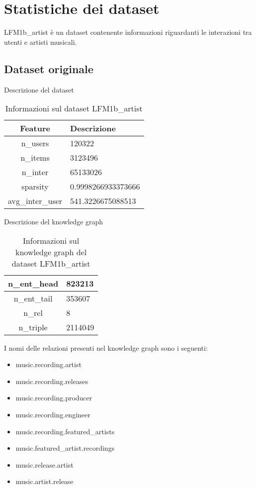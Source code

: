 \section{Statistiche dei dataset}

LFM1b\_artist è un dataset contenente informazioni riguardanti le interazioni tra utenti e artisti musicali.



\subsection{Dataset originale}


Descrizione del dataset
\begin{table}[H]
    \centering
    \footnotesize
    \begin{tabularx}{\textwidth}{|c|X|}
        \hline
        \textbf{Feature} & \textbf{Descrizione} \\
        \hline
        n\_users & 120322 \\
        \hline
        n\_items & 3123496 \\
        \hline
        n\_inter & 65133026 \\
        \hline
        sparsity & 0.9998266933373666 \\
        \hline
        avg\_inter\_user & 541.3226675088513 \\
        \hline
    \end{tabularx}
    \caption{Informazioni sul dataset LFM1b\_artist}
    \label{tab:dataset_info}
\end{table}


\noindent Descrizione del knowledge graph
\begin{table}[H]
    \centering
    \footnotesize
    \begin{tabularx}{\textwidth}{|c|X|}
        \hline
        n\_ent\_head & 823213 \\
        \hline
        n\_ent\_tail & 353607 \\
        \hline
        n\_rel & 8 \\
        \hline
        n\_triple & 2114049 \\
        \hline
    \end{tabularx}
    \caption{Informazioni sul knowledge graph del dataset LFM1b\_artist}
    \label{tab:dataset_info}
\end{table}

\noindent I nomi delle relazioni presenti nel knowledge graph sono i seguenti:
\begin{itemize}
    \item music.recording.artist
    \item music.recording.releases
    \item music.recording.producer
    \item music.recording.engineer
    \item music.recording.featured\_artists
    \item music.featured\_artist.recordings
    \item music.release.artist
    \item music.artist.release
\end{itemize}

